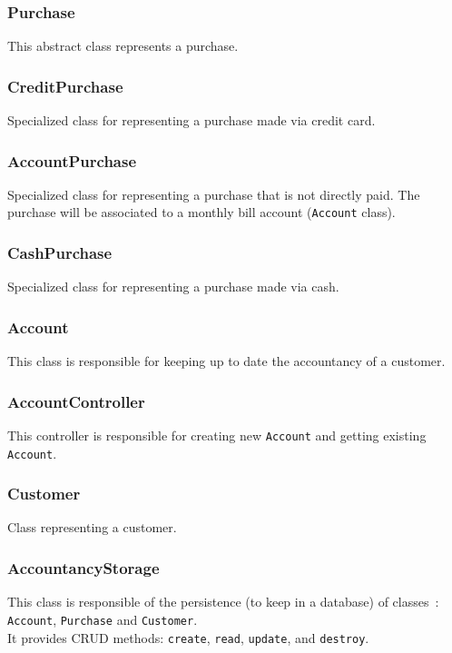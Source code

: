 \documentclass[11pt, a4paper]{article}
\newcommand{\settextlisting}{\lstset{ basicstyle=\small\ttfamily }}
\begin{document}
\subsubsection*{Purchase}
This abstract class represents a purchase.

\subsubsection*{CreditPurchase}
Specialized class for representing a purchase made via credit card.

\subsubsection*{AccountPurchase}
Specialized class for representing a purchase that is not directly paid. The purchase will be associated to a monthly bill account (\lstinline|Account| class).

\subsubsection*{CashPurchase}
Specialized class for representing a purchase made via cash.

\subsubsection*{Account}
This class is responsible for keeping up to date the accountancy of a customer.

\subsubsection*{AccountController}
This controller is responsible for creating new \lstinline|Account| and getting existing \lstinline|Account|.

\subsubsection*{Customer}
Class representing a customer.

\subsubsection*{AccountancyStorage}
\settextlisting
This class is responsible of the persistence (to keep in a database) of \mbox{classes :} \lstinline|Account|, \lstinline|Purchase| and \lstinline|Customer|. \\
It provides CRUD methods: \lstinline|create|, \lstinline|read|, \lstinline|update|, and \lstinline|destroy|.
\end{document}
